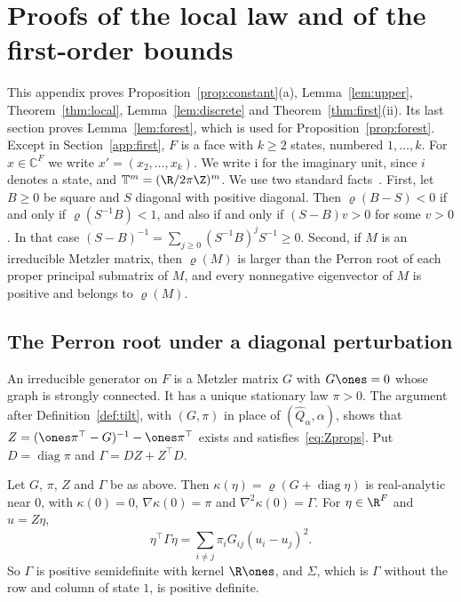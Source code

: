 \section{Proofs of the local law and of the first-order bounds}\label{app:torus}

This appendix proves Proposition~\ref{prop:constant}(a),
Lemma~\ref{lem:upper}, Theorem~\ref{thm:local}, Lemma~\ref{lem:discrete} and
Theorem~\ref{thm:first}(ii). Its last section proves
Lemma~\ref{lem:forest}, which is used for Proposition~\ref{prop:forest}. Except in
Section~\ref{app:first}, $F$ is a face with $k\ge2$ states, numbered
$1,\dots,k$. For $x\in\mathbb C^F$ we write $x'=(x_2,\dots,x_k)$. We write
$\mathrm i$ for the imaginary unit, since $i$ denotes a state, and
$\mathbb T^m=(\R/2\pi\Z)^m$. We use two standard facts~\cite{bermanplemmons1994}.
First, let $B\ge0$ be square and $S$ diagonal with positive diagonal. Then
$\varrho(B-S)<0$ if and only if $\varrho(S^{-1}B)<1$, and also if and only if
$(S-B)v>0$ for some $v>0$. In that case
$(S-B)^{-1}=\sum_{j\ge0}(S^{-1}B)^jS^{-1}\ge0$. Second, if $M$ is an
irreducible Metzler matrix, then $\varrho(M)$ is larger than the Perron root
of each proper principal submatrix of $M$, and every nonnegative eigenvector
of $M$ is positive and belongs to $\varrho(M)$.

\subsection{The Perron root under a diagonal perturbation}

An irreducible generator on $F$ is a Metzler matrix $G$ with $G\ones=0$ whose
graph is strongly connected. It has a unique stationary law $\pi>0$. The
argument after Definition~\ref{def:tilt}, with $(G,\pi)$ in place of
$(\widehat Q_\alpha,\alpha)$, shows that
$Z=(\ones\pi^\top-G)^{-1}-\ones\pi^\top$ exists and
satisfies~\eqref{eq:Zprops}. Put $D=\operatorname{diag}\pi$ and
$\Gamma=DZ+Z^\top D$.

\begin{lemma}\label{lem:perron}
Let $G$, $\pi$, $Z$ and $\Gamma$ be as above. Then
$\kappa(\eta)=\varrho(G+\operatorname{diag}\eta)$ is real-analytic near $0$,
with $\kappa(0)=0$, $\nabla\kappa(0)=\pi$ and $\nabla^2\kappa(0)=\Gamma$. For
$\eta\in\R^F$ and $u=Z\eta$,
\begin{equation}\label{eq:A-dirichlet}
\eta^\top\Gamma\eta=\sum_{i\ne j}\pi_iG_{ij}(u_i-u_j)^2 .
\end{equation}
So $\Gamma$ is positive semidefinite with kernel $\R\ones$, and $\Sigma$,
which is $\Gamma$ without the row and column of state $1$, is positive
definite.
\end{lemma}

